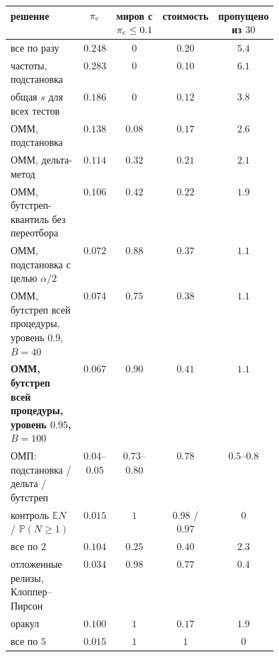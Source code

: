 \documentclass[11pt,a4paper]{article}
\newcommand{\E}{\mathbb{E}}
\newcommand{\Prob}{\mathbb{P}}
\theoremstyle{plain}
\theoremstyle{definition}
\begin{document}
\begin{center}\small
\begin{tabular}{@{}p{0.44\linewidth}cccc@{}}
\toprule
решение & $\pi_{\rm c}$ & \thead{миров с\\$\pi_{\rm c}\le0.1$} & стоимость & \thead{пропущено\\из $30$} \\
\midrule
все по разу & $0.248$ & $0$ & $0.20$ & $5.4$ \\
частоты, подстановка & $0.283$ & $0$ & $0.10$ & $6.1$ \\
общая $s$ для всех тестов & $0.186$ & $0$ & $0.12$ & $3.8$ \\
ОММ, подстановка & $0.138$ & $0.08$ & $0.17$ & $2.6$ \\
ОММ, дельта-метод & $0.114$ & $0.32$ & $0.21$ & $2.1$ \\
ОММ, бутстреп-квантиль без переотбора & $0.106$ & $0.42$ & $0.22$ & $1.9$ \\
ОММ, подстановка с целью $\alpha/2$ & $0.072$ & $0.88$ & $0.37$ & $1.1$ \\
ОММ, бутстреп всей процедуры, уровень $0.9$, $B=40$ & $0.074$ & $0.75$ & $0.38$ & $1.1$ \\
\textbf{ОММ, бутстреп всей процедуры, уровень $0.95$, $B=100$} & $0.067$ & $\mathbf{0.90}$ & $\mathbf{0.41}$ & $1.1$ \\
ОМП: подстановка / дельта / бутстреп & $0.04$--$0.05$ & $0.73$--$0.80$ & $0.78$ & $0.5$--$0.8$ \\
контроль $\E N$ / $\Prob(N\ge1)$ & $0.015$ & $1$ & $0.98$ / $0.97$ & $0$ \\
все по $2$ & $0.104$ & $0.25$ & $0.40$ & $2.3$ \\
отложенные релизы, Клоппер--Пирсон & $0.034$ & $0.98$ & $0.77$ & $0.4$ \\
оракул & $0.100$ & $1$ & $0.17$ & $1.9$ \\
все по $5$ & $0.015$ & $1$ & $1$ & $0$ \\
\bottomrule
\end{tabular}
\end{center}
\end{document}
